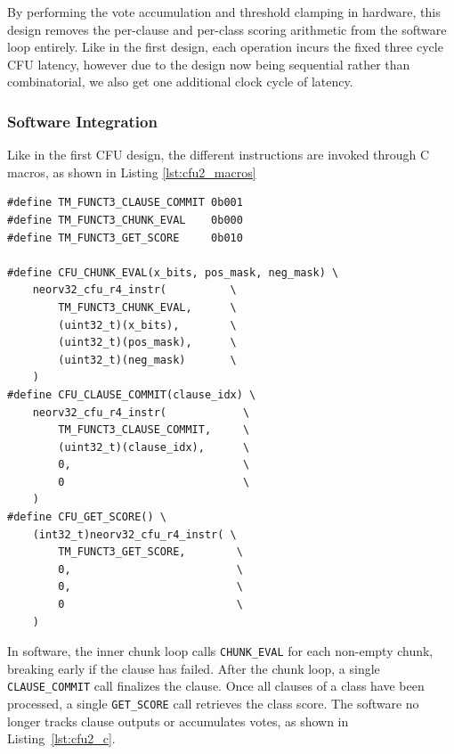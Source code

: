 By performing the vote accumulation and threshold clamping in hardware, this design removes the per-clause and per-class scoring arithmetic from the software loop entirely. Like in the first design, each operation incurs the fixed three cycle CFU latency, however due to the design now being sequential rather than combinatorial, we also get one additional clock cycle of latency.

\subsubsection{Software Integration}
\label{sec:cfu_design2_sw}

Like in the first CFU design, the different instructions are invoked through C macros, as shown in Listing \ref{lst:cfu2_macros}

\begin{code}
\label{lst:cfu2_macros}
\begin{verbatim}
#define TM_FUNCT3_CLAUSE_COMMIT 0b001
#define TM_FUNCT3_CHUNK_EVAL    0b000
#define TM_FUNCT3_GET_SCORE     0b010

#define CFU_CHUNK_EVAL(x_bits, pos_mask, neg_mask) \
    neorv32_cfu_r4_instr(          \
        TM_FUNCT3_CHUNK_EVAL,      \
        (uint32_t)(x_bits),        \
        (uint32_t)(pos_mask),      \
        (uint32_t)(neg_mask)       \
    )
#define CFU_CLAUSE_COMMIT(clause_idx) \
    neorv32_cfu_r4_instr(            \
        TM_FUNCT3_CLAUSE_COMMIT,     \
        (uint32_t)(clause_idx),      \
        0,                           \
        0                            \
    )
#define CFU_GET_SCORE() \
    (int32_t)neorv32_cfu_r4_instr( \
        TM_FUNCT3_GET_SCORE,        \
        0,                          \
        0,                          \
        0                           \
    )
\end{verbatim}
\end{code}


In software, the inner chunk loop calls \texttt{CHUNK\_EVAL} for each non-empty chunk, breaking early if the clause has failed. After the chunk loop, a single \texttt{CLAUSE\_COMMIT} call finalizes the clause. Once all clauses of a class have been processed, a single \texttt{GET\_SCORE} call retrieves the class score. The software no longer tracks clause outputs or accumulates votes, as shown in Listing~\ref{lst:cfu2_c}.


